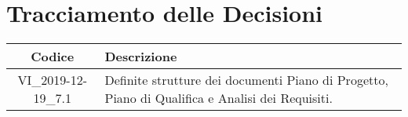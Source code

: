 \section*{Tracciamento delle Decisioni}

\begin{center}
	\begin{longtable}{|c|p{12.25cm}|}
	\hline
	\rowcolor{lighter-grayer}
	\textbf{Codice} & \textbf{Descrizione} \\
	\hline
	\endfirsthead
	
	\hline
	VI\_2019-12-19\_7.1 & Definite strutture dei documenti Piano di Progetto, Piano di Qualifica e Analisi dei Requisiti. \\
	\hline

	\end{longtable}
\end{center}